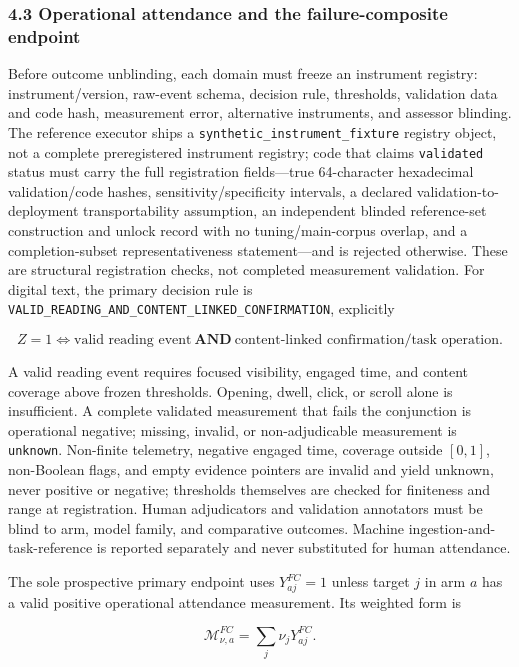 \documentclass[
  11pt]{article}
\begin{document}
\subsubsection{4.3 Operational attendance and the failure-composite
endpoint}\label{operational-attendance-and-the-failure-composite-endpoint}

Before outcome unblinding, each domain must freeze an instrument
registry: instrument/version, raw-event schema, decision rule,
thresholds, validation data and code hash, measurement error,
alternative instruments, and assessor blinding. The reference executor
ships a \texttt{synthetic\_instrument\_fixture} registry object, not a
complete preregistered instrument registry; code that claims
\texttt{validated} status must carry the full registration fields---true
64-character hexadecimal validation/code hashes, sensitivity/specificity
intervals, a declared validation-to-deployment transportability
assumption, an independent blinded reference-set construction and unlock
record with no tuning/main-corpus overlap, and a completion-subset
representativeness statement---and is rejected otherwise. These are
structural registration checks, not completed measurement validation.
For digital text, the primary decision rule is
\texttt{VALID\_READING\_AND\_CONTENT\_LINKED\_CONFIRMATION}, explicitly

\[Z=1\iff \text{valid reading event}\ \mathbf{AND}\ \text{content-linked confirmation/task operation}.\]

A valid reading event requires focused visibility, engaged time, and
content coverage above frozen thresholds. Opening, dwell, click, or
scroll alone is insufficient. A complete validated measurement that
fails the conjunction is operational negative; missing, invalid, or
non-adjudicable measurement is \texttt{unknown}. Non-finite telemetry,
negative engaged time, coverage outside \([0,1]\), non-Boolean flags,
and empty evidence pointers are invalid and yield unknown, never
positive or negative; thresholds themselves are checked for finiteness
and range at registration. Human adjudicators and validation annotators
must be blind to arm, model family, and comparative outcomes. Machine
ingestion-and-task-reference is reported separately and never
substituted for human attendance.

The sole prospective primary endpoint uses \(Y^{FC}_{aj}=1\) unless
target \(j\) in arm \(a\) has a valid positive operational attendance
measurement. Its weighted form is

\[\mathcal M^{FC}_{\nu,a}=\sum_j\nu_jY^{FC}_{aj}.\tag{5}\]
\end{document}
